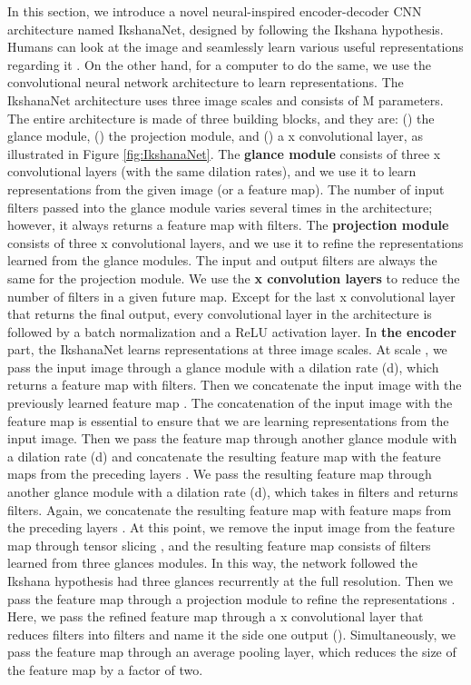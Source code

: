 \documentclass{article}
\begin{document}
\noindent In this section, we introduce a novel neural-inspired encoder-decoder CNN architecture named IkshanaNet, designed by following the Ikshana hypothesis. Humans can look at the image and seamlessly learn various useful representations regarding it \cite{friedman1979framing,potter1976short,intraub1981rapid,oliva2001modeling}. On the other hand, for a computer to do the same, we use the convolutional neural network \cite{hubel1962receptive,fukushima1983neocognitron,lecun1998gradient} architecture to learn representations. The IkshanaNet architecture uses three image scales and consists of M parameters. The entire architecture is made of three building blocks, and they are: () the glance module, () the projection module, and () a x convolutional layer, as illustrated in Figure \ref{fig:IkshanaNet}.\newline
The \textbf{glance module} consists of three x convolutional layers (with the same dilation rates), and we use it to learn representations from the given image (or a feature map). The number of input filters passed into the glance module varies several times in the architecture; however, it always returns a feature map with  filters.
The \textbf{projection module} consists of three x convolutional layers, and we use it to refine the representations learned from the glance modules. The input and output filters are always the same for the projection module.
We use the \textbf{x convolution layers} to reduce the number of filters in a given future map. Except for the last x convolutional layer that returns the final output, every  convolutional layer in the architecture is followed by a batch normalization \cite{ioffe2015batch} and a ReLU \cite{nair2010rectified} activation layer. \newline 
In \textbf{the encoder} part, the IkshanaNet learns representations at three image scales. At scale , we pass the input image through a glance module with a dilation rate (d), which returns a feature map with  filters. Then we concatenate the input image with the previously learned feature map . The concatenation of the input image with the feature map is essential to ensure that we are learning representations from the input image. Then we pass the feature map through another glance module with a dilation rate (d) and concatenate the resulting feature map with the feature maps from the preceding layers . We pass the resulting feature map through another glance module with a dilation rate (d), which takes in  filters and returns  filters. Again, we concatenate the resulting feature map with feature maps from the preceding layers . At this point, we remove the input image from the feature map through tensor slicing , and the resulting feature map consists of  filters learned from three glances modules. In this way, the network followed the Ikshana hypothesis had three glances recurrently at the full resolution. Then we pass the feature map through a projection module to refine the representations . Here, we pass the refined feature map through a x convolutional layer that reduces  filters into  filters and name it the side one output (). Simultaneously, we pass the feature map through an average pooling layer, which reduces the size of the feature map by a factor of two.\newline
\end{document}
